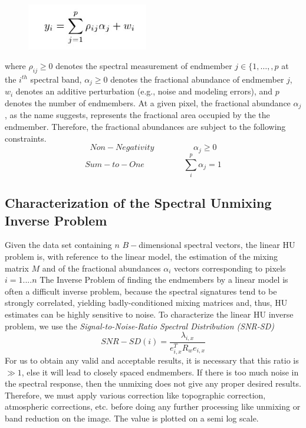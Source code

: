\documentclass[12pt]{svproc}
\begin{document}
\begin{figure}{}
	\includegraphics[width=0.35\linewidth, height=2cm]{Picture4} 
	\label{fig:subim1}
	\centering
\end{figure}

where $\rho_{ij} \geq 0$ denotes the spectral measurement of endmember $j \in \{1,\allowbreak\dots,\allowbreak,p$ at the $i^{th}$ spectral band,
 $\alpha_{j} \geq 0$ denotes the fractional abundance of endmember $j$, $w_{i}$ denotes an additive perturbation (e.g., noise and modeling errors), and $p$ denotes the number of endmembers. At a given pixel, the fractional abundance $\alpha_{j}$, as the name suggests, represents the fractional area occupied by the the endmember. Therefore, the fractional abundances are subject to the following constraints.
 \begin{equation}
 Non-Negativity \hspace{2cm} \alpha_{j} \geq 0
 \end{equation}
  \begin{equation}
Sum-to-One \hspace{2cm} \sum_{i}^{p} \alpha_{j} = 1
\end{equation}

\subsection{Characterization of the Spectral Unmixing Inverse Problem}
Given the data set containing $n$ $B-$dimensional spectral vectors, the linear HU problem is, with reference to the linear model, the estimation of the mixing
matrix $M$ and of the fractional abundances $\alpha_{i}$ vectors corresponding to pixels $i = 1.. .. n$
The Inverse Problem of finding the endmembers by a linear model is often a difficult inverse problem, because the spectral signatures tend to be strongly correlated, yielding badly-conditioned mixing matrices and, thus, HU estimates can be highly sensitive to noise. To characterize the linear HU inverse problem, we use the \emph{Signal-to-Noise-Ratio Spectral Distribution (SNR-SD)} 
 \begin{equation}
SNR-SD(i) = \frac{\lambda_{i,x}}{e_{i,x}^T R_{w} e_{i,x}}
\end{equation}
For us to obtain any valid and acceptable results, it is necessary that this ratio is $\gg 1 $, else it will lead to closely spaced endmembers. If there is too much noise in the spectral response, then the unmixing does not give any proper desired results. Therefore, we must apply various correction like topographic correction, atmospheric corrections, etc. before doing any further processing like unmixing or band reduction on the image. The value is plotted on a semi log scale.
\end{document}
